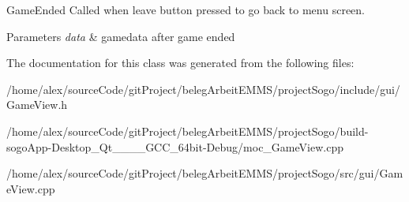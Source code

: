 Game\-Ended Called when leave button pressed to go back to menu screen. 


\begin{DoxyParams}{Parameters}
{\em data} & gamedata after game ended \\
\hline
\end{DoxyParams}


The documentation for this class was generated from the following files\-:\begin{DoxyCompactItemize}
\item 
/home/alex/source\-Code/git\-Project/beleg\-Arbeit\-E\-M\-M\-S/project\-Sogo/include/gui/Game\-View.\-h\item 
/home/alex/source\-Code/git\-Project/beleg\-Arbeit\-E\-M\-M\-S/project\-Sogo/build-\/sogo\-App-\/\-Desktop\-\_\-\-Qt\-\_\-\_\-\_\-\_\-\-G\-C\-C\-\_\-64bit-\/\-Debug/moc\-\_\-\-Game\-View.\-cpp\item 
/home/alex/source\-Code/git\-Project/beleg\-Arbeit\-E\-M\-M\-S/project\-Sogo/src/gui/Game\-View.\-cpp\end{DoxyCompactItemize}
